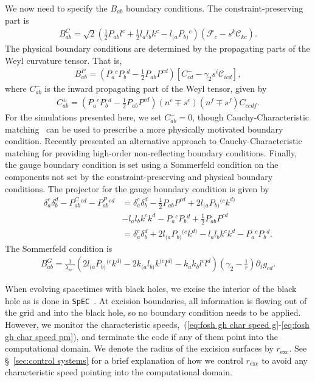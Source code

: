 \begin{bibunit}[unsrtnat]
We now need to specify the $B_{ab}$ boundary conditions. The
constraint-preserving part is
\begin{align}
  \label{eq:fosh gh bc constraint preserving}
  B_{ab}^C=\sqrt{2}\left(\frac{1}{2}P_{ab}l^c + \frac{1}{2}l_al_bk^c -
  l_{(a}P_{b)}{}^c\right)\left(\mathcal{F}_c-s^k\mathcal{C}_{kc}\right).
\end{align}
The physical boundary conditions are determined by the propagating parts of the
Weyl curvature tensor. That is,
\begin{align}
  \label{eq:fosh gh bc physical}
  B_{ab}^P=\left(P_a{}^cP_b{}^d-\frac{1}{2}P_{ab}P^{cd}\right)\left[C^-_{cd}
  -\gamma_2s^i\mathcal{C}_{icd}\right],
\end{align}
where $C^-_{ab}$ is the inward propagating part of the Weyl tensor, given by
\begin{align}
  \label{eq:fosh gh weyl propagating}
  C^{\pm}_{ab}=\left(P_a{}^cP_b{}^d-\frac{1}{2}P_{ab}P^{cd}\right)\left(n^e\mp
  s^e\right)\left(n^f\mp s^f\right)C_{cedf}.
\end{align}
For the simulations presented here, we set $C^-_{ab}=0$, though
Cauchy-Characteristic matching~\cite{Ma:2023qjn} can be used to prescribe a more
physically motivated boundary condition. Recently
\cite{Buchman:2024zsb} presented an alternative approach to
Cauchy-Characteristic matching for providing high-order non-reflecting boundary
conditions. Finally, the gauge boundary condition is set using a Sommerfeld
condition on the components not set by the constraint-preserving and physical
boundary conditions. The projector for the gauge boundary condition is given by
\begin{align}
  \label{eq:fosh gh bc gauge projection}
  \delta_a^c\delta_b^d-P^{C}_{ab}{}^{cd}-P^P_{ab}{}^{cd}
  &=\delta_a^c\delta_b^d-\frac{1}{2}P_{ab}P^{cd}+2l_{(a}P_{b)}{}^{(c}k^{d)}
    \nonumber \\
  &-l_al_bk^ck^d-P_a{}^cP_b{}^d+\frac{1}{2}P_{ab}P^{cd} \nonumber \\
  &=\delta_a^c\delta_b^d+2l_{(a}P_{b)}{}^{(c}k^{d)}
    -l_al_bk^ck^d-P_a{}^cP_b{}^d.
\end{align}
The Sommerfeld condition is
\begin{align}
  \label{eq:fosh gh bc gauge}
  B_{ab}^G=\frac{1}{\lambda_{w^-}}
  \left(2l_{(a}P_{b)}{}^{(c}k^{d)} - 2k_{(a}l_{b)}k^{(c}l^{d)}
  -k_ak_bl^cl^d\right)\left(\gamma_2 - \frac{1}{r}\right)\partial_t
  g_{cd}.
\end{align}

When evolving spacetimes with black holes, we excise the interior of the black
hole as is done in \texttt{SpEC}~\cite{Lindblom:2005qh}. At excision boundaries,
all information is flowing out of the grid and into the black hole, so no
boundary condition needs to be applied. However, we monitor the characteristic
speeds,~(\ref{eq:fosh gh char speed g}-\ref{eq:fosh gh char speed pm}),
and terminate the code if any of them point into the computational domain. We
denote the radius of the excision surfaces by $r_{\mathrm{exc}}$. See 
\S~\ref{sec:control systems} for a brief explanation of how we control
$r_{\mathrm{exc}}$ to avoid any characteristic speed pointing into the
computational domain.


\end{bibunit}
